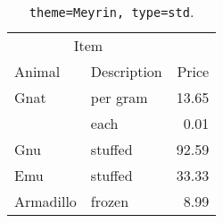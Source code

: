 \begin{table}[!htb]
\large
\centering
\begin{tabular}{llr}
\toprule
\multicolumn{2}{c}{Item} &             \\
\cmidrule(r){1-2}
Animal                   & Description & Price \\
\midrule
Gnat      & per gram & 13.65 \\
          & each     & 0.01  \\
Gnu       & stuffed  & 92.59 \\
Emu       & stuffed  & 33.33 \\
Armadillo & frozen   & 8.99  \\
\bottomrule
\end{tabular}
\caption[\texttt{theme=Meyrin, type=std}]{\texttt{theme=Meyrin, type=std}. }
\end{table}
